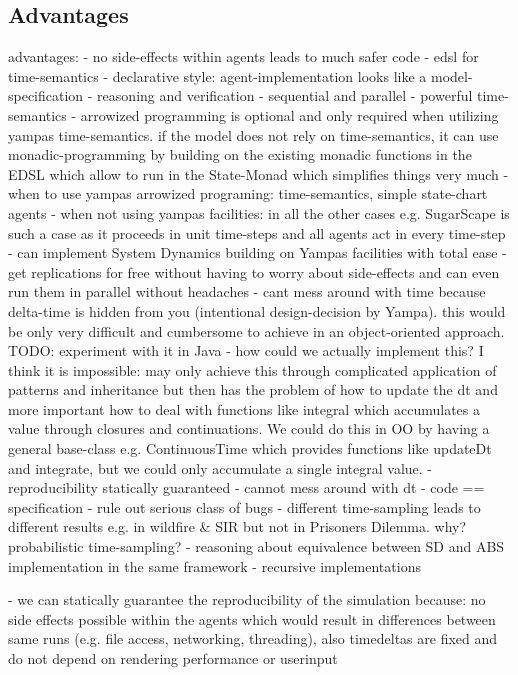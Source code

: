 \subsection{Advantages}
advantages:
	- no side-effects within agents leads to much safer code
	- edsl for time-semantics
	- declarative style: agent-implementation looks like a model-specification
	- reasoning and verification
	- sequential and parallel
	- powerful time-semantics
	- arrowized programming is optional and only required when utilizing yampas time-semantics. if the model does not rely on time-semantics, it can use monadic-programming by building on the existing monadic functions in the EDSL which allow to run in the State-Monad which simplifies things very much
	- when to use yampas arrowized programing: time-semantics, simple state-chart agents 
	- when not using yampas facilities: in all the other cases e.g. SugarScape is such a case as it proceeds in unit time-steps and all agents act in every time-step
	- can implement System Dynamics building on Yampas facilities with total ease	
	- get replications for free without having to worry about side-effects and can even run them in parallel without headaches
	- cant mess around with time because delta-time is hidden from you (intentional design-decision by Yampa). this would be only very difficult and cumbersome to achieve in an object-oriented approach. TODO: experiment with it in Java - how could we actually implement this? I think it is impossible: may only achieve this through complicated application of patterns and inheritance but then has the problem of how to update the dt and more important how to deal with functions like integral which accumulates a value through closures and continuations. We could do this in OO by having a general base-class e.g. ContinuousTime which provides functions like updateDt and integrate, but we could only accumulate a single integral value.
	- reproducibility statically guaranteed
	- cannot mess around with dt
	- code == specification
	- rule out serious class of bugs
	- different time-sampling leads to different results e.g. in wildfire \& SIR but not in Prisoners Dilemma. why? probabilistic time-sampling?
	- reasoning about equivalence between SD and ABS implementation in the same framework
	- recursive implementations
	
	- we can statically guarantee the reproducibility of the simulation because: no side effects possible within the agents which would result in differences between same runs (e.g. file access, networking, threading), also timedeltas are fixed and do not depend on rendering performance or userinput	
	
